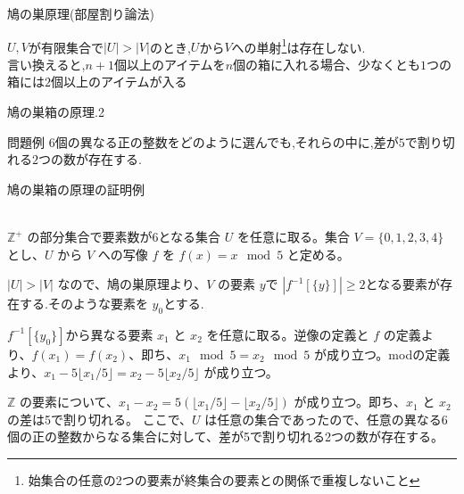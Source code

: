 \documentclass[8pt, jfont=ipaexm]{beamer} %
\begin{document}
\begin{frame}{鳩の巣原理(部屋割り論法)}
    \begin{block}{}
        $U,V$が有限集合で$|U| > |V|$のとき,$U$から$V$への単射\footnote{始集合の任意の2つの要素が終集合の要素との関係で重複しないこと}は存在しない.\\
        言い換えると,$n+1$個以上のアイテムを$n$個の箱に入れる場合、少なくとも$1$つの箱には$2$個以上のアイテムが入る        
    \end{block}
\end{frame}

\begin{frame}{鳩の巣箱の原理.2}
    \begin{exampleblock}{問題例}
    $6$個の異なる正の整数をどのように選んでも,それらの中に,差が$5$で割り切れる$2$つの数が存在する.        
    \end{exampleblock}
    \begin{alertblock}{鳩の巣箱の原理の証明例}


    \mbox{}\\
        \( \mathbb{Z}^+ \) の部分集合で要素数が6となる集合 \( U \) を任意に取る。集合 \( V = \{0, 1, 2, 3, 4\} \) とし、\( U \) から \( V \) への写像 \( f \) を \( f(x) = x \mod 5 \) と定める。

\( |U| > |V| \) なので、鳩の巣原理より、\( V \) の要素 $y$で $|f^{-1}[\{y\}]| \geq 2$となる要素が存在する.そのような要素を $y_0$とする.

$f^{-1}[\{y_0\}]$から異なる要素 \( x_1 \) と \( x_2 \) を任意に取る。逆像の定義と \( f \) の定義より、\( f(x_1) = f(x_2) \)、即ち、\( x_1 \mod 5 = x_2 \mod 5 \) が成り立つ。modの定義より、\( x_1 - 5 \lfloor x_1 / 5 \rfloor = x_2 - 5 \lfloor x_2 / 5 \rfloor \) が成り立つ。

\( \mathbb{Z} \) の要素について、\( x_1 - x_2 = 5(\lfloor x_1 / 5 \rfloor - \lfloor x_2 / 5 \rfloor) \) が成り立つ。即ち、\( x_1 \) と \( x_2 \) の差は5で割り切れる。
ここで、\( U \) は任意の集合であったので、任意の異なる6個の正の整数からなる集合に対して、差が5で割り切れる2つの数が存在する。

    \end{alertblock}
\end{frame}
\end{document}
